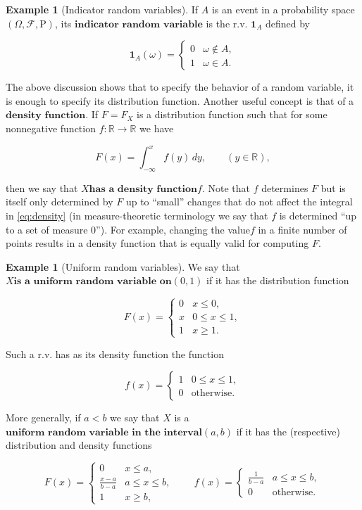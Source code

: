 \documentclass[11pt]{report}
\providecommand{\cal}{\mathcal}
\newcommand{\R}{\mathbb{R}}
\theoremstyle{plain}
\theoremstyle{definition}
\newtheorem{example}[thm]{Example}
\begin{document}
\begin{example}[Indicator random variables]
If $A$ is an event in a probability space
$(\Omega, {\cal F}, \mathrm{P})$, its
$\textbf{indicator random variable}$ is the r.v.
$\mathbf{1}_A$ defined by

\[
\mathbf{1}_A(\omega) = \begin{cases} 0 & \omega \notin A, \\ 1 & \omega \in A. \end{cases}
\]

\noindent The above discussion shows that to specify the
behavior of a random variable, it is enough to specify
its distribution function. Another useful concept is
that of a $\textbf{density function}$. If $F=F_X$ is
a distribution function such that for some nonnegative
function $f:\R\to\R$ we have

\begin{equation*} \tag{4}\label{eq:density}
F(x) = \int_{-\infty}^x f(y)\,dy, \qquad (y\in\R),
\end{equation*}

\noindent then we say that $\textbf{$X$has a density function$f
$}$. Note that $f$ determines $F$ but is itself only
determined by $F$ up to ``small'' changes that do not
affect the integral in \eqref{eq:density} (in
measure-theoretic terminology we say that $f$ is
determined ``up to a set of measure $0$''). For
example, changing the value$f$ in a finite number of
points results in a density function that is equally
valid for computing $F$.
\end{example}

\begin{example}[Uniform random variables]
We say that $\textbf{$X
$is a uniform random variable on$(0,1)$}$ if it has
the distribution function

\[
F(x) = \begin{cases} 0 & x \le 0, \\
x & 0\le x \le 1, \\
1 & x \ge 1.
\end{cases}
\]

\noindent Such a r.v. has as its density function the function

\[
f(x) = \begin{cases} 1 & 0\le x\le 1,\\ 0&\textrm{otherwise.}\end{cases}
\]

\noindent More generally, if $a<b$ we say that $X$ is a
$\textbf{uniform random variable in the interval$(a,b)
$}$ if it has the (respective) distribution and
density functions

\[
F(x) = \begin{cases} 0 & x \le a, \\ \frac{x-a}{b-a} & a\le x\le b, \\ 1 & x\ge b, \end{cases}
\qquad
f(x) = \begin{cases} \frac{1}{b-a} & a\le x\le b, \\ 0 & \textrm{otherwise.}
\end{cases}
\]

\end{example}
\end{document}
